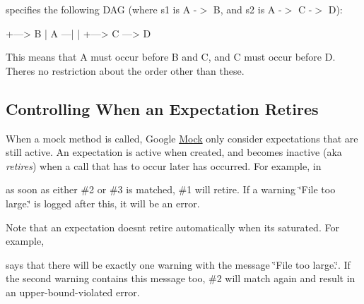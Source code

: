 specifies the following D\+AG (where {\ttfamily s1} is {\ttfamily A -\/$>$ B}, and {\ttfamily s2} is {\ttfamily A -\/$>$ C -\/$>$ D})\+:


\begin{DoxyCode}
     +---> B
     |
A ---|
     |
     +---> C ---> D
\end{DoxyCode}


This means that A must occur before B and C, and C must occur before D. There\textquotesingle{}s no restriction about the order other than these.

\subsection*{Controlling When an Expectation Retires}

When a mock method is called, Google \hyperlink{class_mock}{Mock} only consider expectations that are still active. An expectation is active when created, and becomes inactive (aka {\itshape retires}) when a call that has to occur later has occurred. For example, in




as soon as either \#2 or \#3 is matched, \#1 will retire. If a warning {\ttfamily \char`\"{}\+File too large.\char`\"{}} is logged after this, it will be an error.

Note that an expectation doesn\textquotesingle{}t retire automatically when it\textquotesingle{}s saturated. For example,




says that there will be exactly one warning with the message {\ttfamily \char`\"{}\+File
too large.\char`\"{}}. If the second warning contains this message too, \#2 will match again and result in an upper-\/bound-\/violated error.

